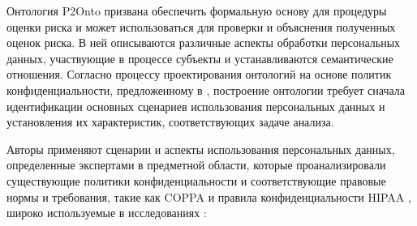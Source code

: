 \documentclass[../main]{subfiles}
\begin{document}
Онтология P2Onto призвана обеспечить формальную основу для процедуры оценки риска и может использоваться для проверки и объяснения полученных оценок риска. В ней описываются различные аспекты обработки персональных данных, участвующие в процессе субъекты и устанавливаются семантические отношения. Согласно процессу проектирования онтологий на основе политик конфиденциальности, предложенному в \cite{MDPI8}, построение онтологии требует сначала идентификации основных сценариев использования персональных данных и установления их характеристик, соответствующих задаче анализа.

Авторы \cite{P2Onto} применяют сценарии и аспекты использования персональных данных, определенные экспертами в предметной области, которые проанализировали существующие политики конфиденциальности и соответствующие правовые нормы и требования, такие как COPPA \cite{MDPI2} и правила конфиденциальности HIPAA \cite{MDPI3}, широко используемые в исследованиях \cite{MDPI6, MDPI8, MDPI18}:
\end{document}

